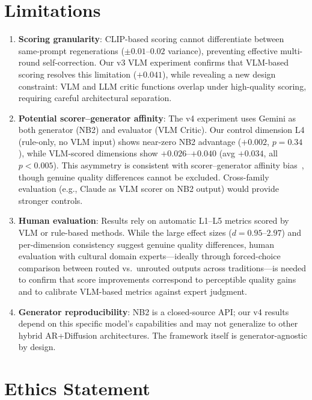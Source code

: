 \documentclass[sigconf, screen, review, anonymous]{acmart}
\newcommand{\Lx}[1]{L#1}
\begin{document}
\section*{Limitations}

\begin{enumerate}
    \item \textbf{Scoring granularity}: CLIP-based scoring cannot differentiate between same-prompt regenerations ($\pm 0.01$--$0.02$ variance), preventing effective multi-round self-correction. Our v3 VLM experiment confirms that VLM-based scoring resolves this limitation ($+0.041$), while revealing a new design constraint: VLM and LLM critic functions overlap under high-quality scoring, requiring careful architectural separation.
    \item \textbf{Potential scorer--generator affinity}: The v4 experiment uses Gemini as both generator (NB2) and evaluator (VLM Critic). Our control dimension \Lx{4} (rule-only, no VLM input) shows near-zero NB2 advantage ($+0.002$, $p = 0.34$), while VLM-scored dimensions show $+0.026$--$+0.040$ (avg $+0.034$, all $p < 0.005$). This asymmetry is consistent with scorer--generator affinity bias~\cite{panickssery2024llm}, though genuine quality differences cannot be excluded. Cross-family evaluation (e.g., Claude as VLM scorer on NB2 output) would provide stronger controls.
    \item \textbf{Human evaluation}: Results rely on automatic \Lx{1}--\Lx{5} metrics scored by VLM or rule-based methods. While the large effect sizes ($d = 0.95$--$2.97$) and per-dimension consistency suggest genuine quality differences, human evaluation with cultural domain experts---ideally through forced-choice comparison between routed vs.\ unrouted outputs across traditions---is needed to confirm that score improvements correspond to perceptible quality gains and to calibrate VLM-based metrics against expert judgment.
    \item \textbf{Generator reproducibility}: NB2 is a closed-source API; our v4 results depend on this specific model's capabilities and may not generalize to other hybrid AR+Diffusion architectures. The framework itself is generator-agnostic by design.
\end{enumerate}

\section*{Ethics Statement}
\end{document}
